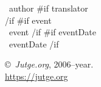 \documentclass[11pt]{article}
\begin{document}

\ProblemInformation

\Author\ {{author}}
{{#if translator}}
    \\ 
{{/if}}
{{#if event}}
    \\
    \Event\ {{event}}
{{/if}}
{{#if eventDate}}
    \\
    \EventDate\ {{eventDate}}
{{/if}}

\bigskip


\bigskip

\copyright\ \emph{Jutge.org}, 2006--{{year}}.
\\
\href{https://jutge.org}{https://jutge.org}
\end{document}
